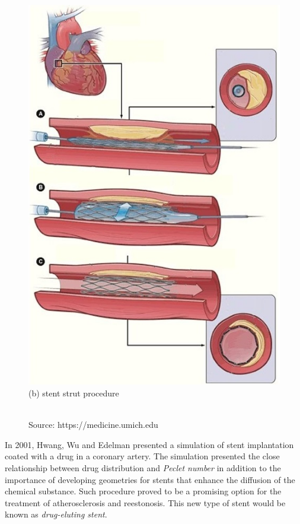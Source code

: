 \begin{figure}[H]
\begin{minipage}{.50\linewidth}
      \includegraphics[scale=0.5]{./02_chaps/cap_review/figure/stent_bare.jpg}\\
      (b) stent strut procedure
     \end{minipage}\\[3mm]
     \source Source: https://medicine.umich.edu 
     \label{procedimentos PTCA}
\end{figure}

\medskip
In 2001, Hwang, Wu and Edelman \cite{hwang2001} presented a simulation of stent implantation
coated with a drug in a coronary artery. 
The simulation presented the
close relationship between drug distribution and \textit{Peclet number}
in addition to the importance of developing geometries for stents that enhance
the diffusion of the chemical substance. 
Such procedure proved to be a promising option
for the treatment of atherosclerosis and reestonosis. 
This new type of stent
would be known as \textit{drug-eluting stent}.


